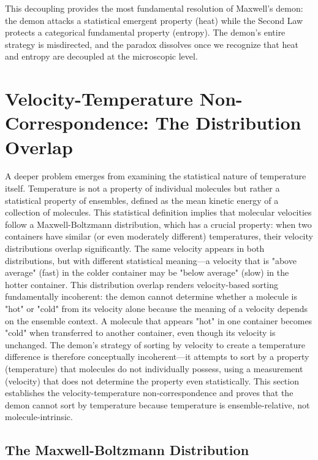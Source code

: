\documentclass[12pt,a4paper]{article}
\theoremstyle{definition}
\theoremstyle{remark}
\begin{document}
This decoupling provides the most fundamental resolution of Maxwell's demon: the demon attacks a statistical emergent property (heat) while the Second Law protects a categorical fundamental property (entropy). The demon's entire strategy is misdirected, and the paradox dissolves once we recognize that heat and entropy are decoupled at the microscopic level.

\section{Velocity-Temperature Non-Correspondence: The Distribution Overlap}
\label{sec:velocity_overlap}

A deeper problem emerges from examining the statistical nature of temperature itself. Temperature is not a property of individual molecules but rather a statistical property of ensembles, defined as the mean kinetic energy of a collection of molecules. This statistical definition implies that molecular velocities follow a Maxwell-Boltzmann distribution, which has a crucial property: when two containers have similar (or even moderately different) temperatures, their velocity distributions overlap significantly. The same velocity appears in both distributions, but with different statistical meaning—a velocity that is "above average" (fast) in the colder container may be "below average" (slow) in the hotter container. This distribution overlap renders velocity-based sorting fundamentally incoherent: the demon cannot determine whether a molecule is "hot" or "cold" from its velocity alone because the meaning of a velocity depends on the ensemble context. A molecule that appears "hot" in one container becomes "cold" when transferred to another container, even though its velocity is unchanged. The demon's strategy of sorting by velocity to create a temperature difference is therefore conceptually incoherent—it attempts to sort by a property (temperature) that molecules do not individually possess, using a measurement (velocity) that does not determine the property even statistically. This section establishes the velocity-temperature non-correspondence and proves that the demon cannot sort by temperature because temperature is ensemble-relative, not molecule-intrinsic.

\subsection{The Maxwell-Boltzmann Distribution}
\end{document}
